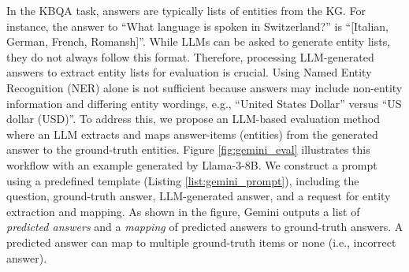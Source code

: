 
In the KBQA task, answers are typically lists of entities from the KG. For instance, the answer to ``What language is spoken in Switzerland?'' is ``[Italian, German, French, Romansh]''. While LLMs can be asked to generate entity lists, they do not always follow this format. Therefore, processing LLM-generated answers to extract entity lists for evaluation is crucial. Using Named Entity Recognition (NER) alone is not sufficient because answers may include non-entity information and differing entity wordings, e.g., ``United States Dollar'' versus ``US dollar (USD)''.
To address this, we propose an LLM-based evaluation method where an LLM extracts and maps answer-items (entities) from the generated answer to the ground-truth entities. Figure \ref{fig:gemini_eval} illustrates this workflow with an example generated by Llama-3-8B. We construct a prompt using a predefined template (Listing \ref{list:gemini_prompt}), including the question, ground-truth answer, LLM-generated answer, and a request for entity extraction and mapping. As shown in the figure, Gemini outputs a list of \textit{predicted answers} and a \textit{mapping} of predicted answers to ground-truth answers. A predicted answer can map to multiple ground-truth items or none (i.e., incorrect answer).

